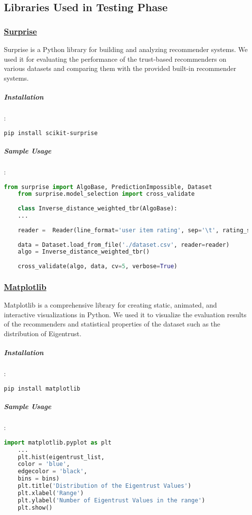 \subsection{Libraries Used in Testing Phase}
	\subsubsection{\href{http://surpriselib.com/}{Surprise}} 
	Surprise is a Python library for building and analyzing recommender systems. We used it for evaluating the performance of the trust-based recommenders on various datasets and comparing them with the provided built-in recommender systems.
	\label{surprise}
	\subparagraph{Installation}:
	\begin{lstlisting}[language=bash]
	pip install scikit-surprise
	\end{lstlisting}
	
	\subparagraph{Sample Usage}:
	\begin{lstlisting}[language=python, caption=Surprise example]
	from surprise import AlgoBase, PredictionImpossible, Dataset
	from surprise.model_selection import cross_validate
	
	class Inverse_distance_weighted_tbr(AlgoBase):
	...
	
	reader =  Reader(line_format='user item rating', sep='\t', rating_scale=(1, 5))
	
	data = Dataset.load_from_file('./dataset.csv', reader=reader)
	algo = Inverse_distance_weighted_tbr()
	
	cross_validate(algo, data, cv=5, verbose=True)
	\end{lstlisting}
	
	\subsubsection{\href{https://matplotlib.org/}{Matplotlib}}
	Matplotlib is a comprehensive library for creating static, animated, and interactive visualizations in Python. We used it to visualize the evaluation results of the recommenders and  statistical properties of the dataset such as the distribution of Eigentrust.
	\subparagraph{Installation}:
	\begin{lstlisting}[language=bash]
	pip install matplotlib
	\end{lstlisting}
	
	\subparagraph{Sample Usage}:
	\begin{lstlisting}[language=python, caption=Matplotlib example]
	import matplotlib.pyplot as plt
	...
	plt.hist(eigentrust_list, 
	color = 'blue', 
	edgecolor = 'black',
	bins = bins)
	plt.title('Distribution of the Eigentrust Values')
	plt.xlabel('Range')
	plt.ylabel('Number of Eigentrust Values in the range')
	plt.show() 
	\end{lstlisting}